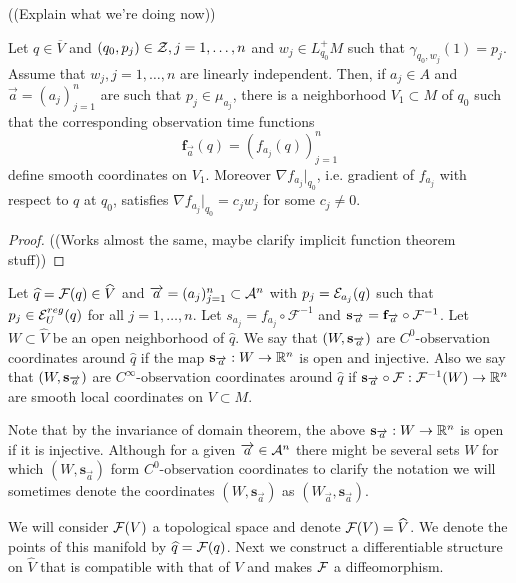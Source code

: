 ((Explain what we're doing now))

\begin{proposition}\label{prop:observationtimecoordinates}
Let $q\in \overline{V}$ and $(q_0,p_j)\in \mc{Z}, j=1,\dots, n$ and $w_j\in L^+_{q_0}M$ such that $\gamma_{q_0,w_j}(1) = p_j$. Assume that $w_j, j=1,\dots, n$ are linearly independent. Then, if $a_j\in A$ and $\overrightarrow{a} = (a_j)^n_{j=1}$ are such that $p_j\in \mu_{a_j}$, there is a neighborhood $V_1\subset M$ of $q_0$ such that the corresponding observation time functions 
\[
\mathbf{f}_{\overrightarrow{a}}(q) = (f_{a_j}(q))^n_{j=1}
\]
define smooth coordinates on $V_1$. Moreover $\nabla f_{a_j}\rvert_{q_0}$, i.e. gradient of $f_{a_j}$ with respect to $q$ at $q_0$, satisfies $\nabla f_{a_j}\rvert_{q_0} = c_jw_j$ for some $c_j\neq 0$.
\end{proposition}
\begin{proof}
((Works almost the same, maybe clarify implicit function theorem stuff))
\end{proof}

\begin{definition}
Let $\widehat{q}=\F(q)\in \widehat{V}$ and $\aa = (a_j)^n_{j=1}\subset \ca^n$ with $p_j = \mc{E}_{a_j}(q)$ such that $p_j\in \mc{E}_U^{reg}(q)$ for all $j=1,\dots,n$. Let $s_{a_j} = f_{a_j} \circ \mathcal{F}^{-1}$ and $\mathbf{s}_{\overrightarrow{a}}=\mathbf{f}_{\overrightarrow{a}}\circ\mc{F}^{-1}$. Let $W\subset\widehat{V}$ be an open neighborhood of $\widehat{q}$. We say that $(W,\mathbf{s}_\aa)$ are $C^0$-observation coordinates around $\widehat{q}$ if the map $\mathbf{s}_\aa:W\to \R^n$ is open and injective. Also we say that $(W,\mathbf{s}_\aa)$ are $C^\infty$-observation coordinates around $\widehat{q}$ if $\mathbf{s}_{\overrightarrow{a}}\circ\mc{F}:\mc{F}^{-1}(W)\to \R^n$ are smooth local coordinates on $V\subset M$.
\end{definition}
Note that by the invariance of domain theorem, the above $\mathbf{s}_{\overrightarrow{a}}:W\to \R^n$ is open if it is injective.
Although for a given $\overrightarrow{a}\in \ca^n$ there might be several sets $W$ for which $(W,\mathbf{s}_{\overrightarrow{a}})$ form $C^0$-observation coordinates to clarify the notation we will sometimes denote the coordinates $(W,\mathbf{s}_{\overrightarrow{a}})$ as $(W_{\overrightarrow{a}},\mathbf{s}_{\overrightarrow{a}})$. 

We will consider $\mc{F}(V)$ a topological space and denote $\mc{F}(V)=\widehat{V}$. We denote the points of this manifold by $\widehat{q}=\mc{F}(q)$. Next we construct a differentiable structure on $\widehat{V}$ that is compatible with that of $V$ and makes $\F$ a diffeomorphism.


